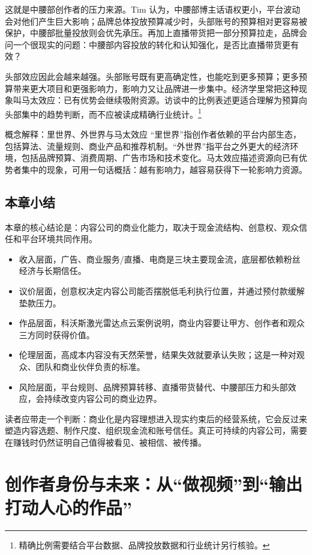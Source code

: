 \documentclass[a4paper]{article}
\begin{document}
这就是中腰部创作者的压力来源。Tim 认为，中腰部博主话语权更小，平台波动会对他们产生巨大影响；品牌总体投放预算减少时，头部账号的预算相对更容易被保护，中腰部批量投放则会优先承压。再加上直播带货把一部分预算拉走，品牌会问一个很现实的问题：中腰部内容投放的转化和认知强化，是否比直播带货更有效？

头部效应因此会越来越强。头部账号既有更高确定性，也能吃到更多预算；更多预算带来更大项目和更强影响力，影响力又让品牌进一步集中。经济学里常把这种现象叫马太效应：已有优势会继续吸附资源。访谈中的比例表述更适合理解为预算向头部集中的趋势判断，而不应被读成精确行业统计。\footnote{精确比例需要结合平台数据、品牌投放数据和行业统计另行核验。}

\begin{knowledgebox}{概念解释：里世界、外世界与马太效应}
“里世界”指创作者依赖的平台内部生态，包括算法、流量规则、商业产品和推荐机制。“外世界”指平台之外更大的经济环境，包括品牌预算、消费周期、广告市场和技术变化。马太效应描述资源向已有优势者集中的现象，可用一句话概括：越有影响力，越容易获得下一轮影响力资源。
\end{knowledgebox}

\subsection{本章小结}

本章的核心结论是：内容公司的商业化能力，取决于现金流结构、创意权、观众信任和平台环境共同作用。

\begin{itemize}
  \item 收入层面，广告、商业服务/直播、电商是三块主要现金流，底层都依赖粉丝经济与长期信任。
  \item 议价层面，创意权决定内容公司能否摆脱低毛利执行位置，并通过预付款缓解垫款压力。
  \item 作品层面，科沃斯激光雷达点云案例说明，商业内容要让甲方、创作者和观众三方同时获得价值。
  \item 伦理层面，高成本内容没有天然荣誉，结果失效就要承认失败；这是一种对观众、团队和商业伙伴负责的标准。
  \item 风险层面，平台规则、品牌预算转移、直播带货替代、中腰部压力和头部效应，会持续改变内容公司的商业边界。
\end{itemize}

读者应带走一个判断：商业化是内容理想进入现实约束后的经营系统，它会反过来塑造内容选题、制作尺度、组织现金流和账号信任。真正可持续的内容公司，需要在赚钱时仍然证明自己值得被看见、被相信、被传播。
\section{创作者身份与未来：从“做视频”到“输出打动人心的作品”}
\end{document}
